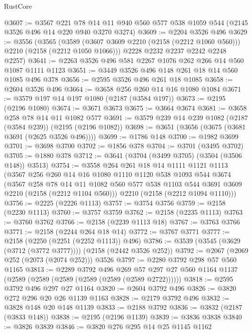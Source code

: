 \begin{lexlean}{RustCore}
\begin{coremodule}
@3607 := @3567
    @221
    @78
    @14
    @11
    @940
    @560
    @577
    @538
    @1059
    @544
    (@2145 @3526 @496 @14 @220 @940 @3270 @3274)
@3609 := @2204 @3526 @496
@3629 := @3556
    (@3565
      (@3589 (@3607 @3609 @2210 (@2158 (@2212 @1060 @560))) @2210 (@2158 (@2212 @1050 @1066)))
      @2228
      @2232
      @2237
      @2242
      @2248
      @2257)
@3641 := @2263 @3526 @496 @581 @2267 @1076 @262 @266 @14 @560 @1087 @1111 @1123
@3651 := @3449 @3526 @496 @148 @261 @18 @14 @560 @1085 @496 @378
@3656 := @2595 @3526 @496 @261 @18 @1085
@3658 := @2604 @3526 @496
@3664 := @3658 @256 @260 @14 @16 @1080 @1084
@3671 := @3579 @197 @14 @197 @1080 (@2187 (@3584 @197))
@3673 := @2195 (@2196 @1080)
@3674 := @3671 @3673
@3675 := @3664 @3674
@3681 := @3658 @258 @78 @14 @11 @1082 @577
@3691 := @3579 @239 @14 @239 @1082 (@2187 (@3584 @239)) (@2195 (@2196 @1082))
@3698 := @3651 (@3656 (@3675 (@3681 @3691 (@2625 @3526 @496))))
@3699 := @1786 @148
@3700 := @1982 @3699
@3701 := @3698 @3700
@3702 := @1856 @378
@3704 := @3701 (@3495 @3702)
@3705 := @1880 @378
@3712 := @3641 (@3704 (@3499 @3705) (@3504 (@3506 @148)) @3513)
@3754 := @3558
    @264
    @261
    @18
    @14
    @1111
    @1121
    @1113
    (@3567
      @256
      @260
      @14
      @16
      @1080
      @1110
      @1120
      @538
      @1093
      @544
      @3674
      (@3567
        @258
        @78
        @14
        @11
        @1082
        @560
        @577
        @538
        @1103
        @544
        @3691
        @3609
        @2210
        (@2158 (@2212 @1104 @560)))
      @2210
      (@2158 (@2212 @1094 @1110)))
@3756 := @2225 (@2226 @1113)
@3757 := @3754 @3756
@3759 := @2158 (@2230 @1113)
@3760 := @3757 @3759
@3762 := @2158 (@2235 @1113)
@3763 := @3760 @3762
@3766 := @2158 (@2239 @1113 @18)
@3767 := @3763 @3766
@3771 := @2158 (@2244 @264 @18 @14)
@3772 := @3767 @3771
@3777 := @2158 (@2250 (@2251 (@2252 @1113)) @496)
@3786 := @3539 (@3545 (@3629 (@3712 (@3772 @3777)))) (@2158 (@2442 @3526 @252))
@3792 := @2067 (@2069 @252 (@2073 (@2074 @252))) @3526
@3797 := @2280 @3792 @298 @57 @560 @1165
@3813 := @2289
    @3792
    @496
    @269
    @57
    @297
    @27
    @560
    @1164
    @1137
    (@2589 (@2589 (@2589 (@2589 (@2589 (@2589 @2722))))))
@3818 := @2595 @3792 @496 @297 @27 @1164
@3820 := @2604 @3792 @496
@3826 := @3820 @272 @296 @20 @26 @1139 @1163
@3828 := @2179 @3792 @496
@3832 := @3828 @148 @20 @148 @1139
@3833 := @2188 @3792
@3836 := @3832 (@2187 (@3833 @148))
@3838 := @2195 (@2196 @1139)
@3839 := @3836 @3838
@3840 := @3826 @3839
@3846 := @3820 @276 @295 @14 @25 @1145 @1162

\end{coremodule}
\end{lexlean}
